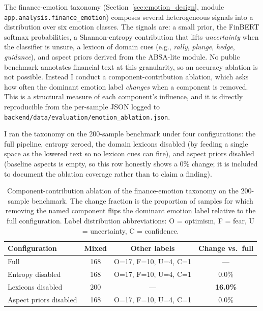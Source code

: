 The finance-emotion taxonomy (Section~\ref{sec:emotion_design}, module \texttt{app.analysis.finance\_emotion}) composes several heterogeneous signals into a distribution over six emotion classes. The signals are: a small prior, the FinBERT softmax probabilities, a Shannon-entropy contribution that lifts \textit{uncertainty} when the classifier is unsure, a lexicon of domain cues (e.g., \textit{rally}, \textit{plunge}, \textit{hedge}, \textit{guidance}), and aspect priors derived from the ABSA-lite module. No public benchmark annotates financial text at this granularity, so an accuracy ablation is not possible. Instead I conduct a component-contribution ablation, which asks how often the dominant emotion label \emph{changes} when a component is removed. This is a structural measure of each component's influence, and it is directly reproducible from the per-sample JSON logged to \texttt{backend/data/evaluation/emotion\_ablation.json}.

I ran the taxonomy on the 200-sample benchmark under four configurations: the full pipeline, entropy zeroed, the domain lexicons disabled (by feeding a single space as the lowered text so no lexicon cues can fire), and aspect priors disabled (baseline aspects is empty, so this row honestly shows a 0\% change; it is included to document the ablation coverage rather than to claim a finding).

\begin{table}[H]
  \centering
  \caption{Component-contribution ablation of the finance-emotion taxonomy on the 200-sample benchmark. The change fraction is the proportion of samples for which removing the named component flips the dominant emotion label relative to the full configuration. Label distribution abbreviations: O = optimism, F = fear, U = uncertainty, C = confidence.}
  \label{tab:emotion_ablation}
  \begin{tabular}{@{}lccc@{}}
    \toprule
    \textbf{Configuration} & \textbf{Mixed} & \textbf{Other labels} & \textbf{Change vs.\ full} \\
    \midrule
    Full                      & 168 & O=17, F=10, U=4, C=1 & --- \\
    Entropy disabled          & 168 & O=17, F=10, U=4, C=1 & 0.0\% \\
    Lexicons disabled         & 200 & ---                  & \textbf{16.0\%} \\
    Aspect priors disabled    & 168 & O=17, F=10, U=4, C=1 & 0.0\% \\
    \bottomrule
  \end{tabular}
\end{table}

